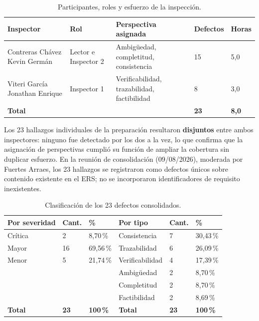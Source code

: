 \documentclass[11pt]{article}
\begin{document}
	\begin{table}[H]
		\centering
		\caption{Participantes, roles y esfuerzo de la inspección.}
		\label{tab:roles-inspeccion}
		\small
		\begin{tabularx}{\textwidth}{|L{4.5cm}|L{3cm}|X|C{2cm}|C{1.5cm}|}
			\hline
			\textbf{Inspector} & \textbf{Rol} & \textbf{Perspectiva asignada} & \textbf{Defectos} & \textbf{Horas} \\
			\hline
			Contreras Chávez Kevin Germán & Lector e Inspector 2 & Ambigüedad, completitud, consistencia & 15 & 5,0 \\
			\hline
			Viteri García Jonathan Enrique & Inspector 1 & Verificabilidad, trazabilidad, factibilidad & 8 & 3,0 \\
			\hline
			\textbf{Total} & & & \textbf{23} & \textbf{8,0} \\
			\hline
		\end{tabularx}
	\end{table}
	
	Los 23 hallazgos individuales de la preparación resultaron \textbf{disjuntos} entre ambos inspectores: ninguno fue detectado por los dos a la vez, lo que confirma que la asignación de perspectivas cumplió su función de ampliar la cobertura sin duplicar esfuerzo. En la reunión de consolidación (09/08/2026), moderada por Fuertes Arraes, los 23 hallazgos se registraron como defectos únicos sobre contenido existente en el ERS; no se incorporaron identificadores de requisito inexistentes.
	
	\begin{table}[H]
		\centering
		\caption{Clasificación de los 23 defectos consolidados.}
		\label{tab:clasificacion-defectos}
		\small
		\begin{tabular}{L{2.8cm} C{1.3cm} C{1.5cm} L{2.8cm} C{1.3cm} C{1.5cm}}
			\toprule
			\textbf{Por severidad} & \textbf{Cant.} & \textbf{\%} & \textbf{Por tipo} & \textbf{Cant.} & \textbf{\%} \\
			\midrule
			Crítica & 2 & 8,70\,\% & Consistencia & 7 & 30,43\,\% \\
			Mayor & 16 & 69,56\,\% & Trazabilidad & 6 & 26,09\,\% \\
			Menor & 5 & 21,74\,\% & Verificabilidad & 4 & 17,39\,\% \\
			& & & Ambigüedad & 2 & 8,70\,\% \\
			& & & Completitud & 2 & 8,70\,\% \\
			& & & Factibilidad & 2 & 8,69\,\% \\
			\midrule
			\textbf{Total} & \textbf{23} & \textbf{100\,\%} & \textbf{Total} & \textbf{23} & \textbf{100\,\%} \\
			\bottomrule
		\end{tabular}
	\end{table}
	
\end{document}
